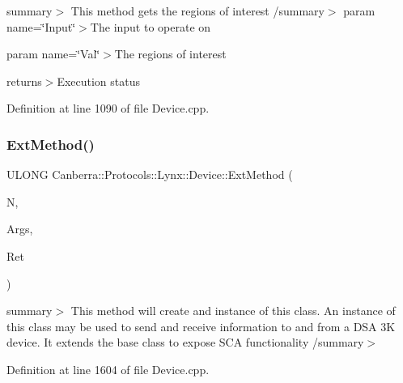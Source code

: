 summary$>$ This method gets the regions of interest /summary$>$ param name=\char`\"{}\+Input\char`\"{}$>$The input to operate on

param name=\char`\"{}\+Val\char`\"{}$>$The regions of interest

returns$>$Execution status

Definition at line 1090 of file Device.\+cpp.

\mbox{\label{class_canberra_1_1_protocols_1_1_lynx_1_1_device_a0d3ade2b5f6cbc402008bad5427d3da6_a0d3ade2b5f6cbc402008bad5427d3da6}} 
\subsubsection{\texorpdfstring{Ext\+Method()}{ExtMethod()}}
{\footnotesize\ttfamily U\+L\+O\+NG Canberra\+::\+Protocols\+::\+Lynx\+::\+Device\+::\+Ext\+Method (\begin{DoxyParamCaption}\item[{const \hyperlink{class_canberra_1_1_utility_1_1_core_1_1_string}{Canberra\+::\+Utility\+::\+Core\+::\+String} \&}]{N,  }\item[{const \hyperlink{class_canberra_1_1_utility_1_1_core_1_1_variant_array}{Canberra\+::\+Utility\+::\+Core\+::\+Variant\+Array} \&}]{Args,  }\item[{\hyperlink{class_canberra_1_1_utility_1_1_core_1_1_variant_array}{Canberra\+::\+Utility\+::\+Core\+::\+Variant\+Array} \&}]{Ret }\end{DoxyParamCaption})}

summary$>$ This method will create and instance of this class. An instance of this class may be used to send and receive information to and from a D\+SA 3K device. It extends the base class to expose S\+CA functionality /summary$>$ 

Definition at line 1604 of file Device.\+cpp.

\mbox{\label{class_canberra_1_1_protocols_1_1_lynx_1_1_device_ac77d98daff94392709601858b2980766_ac77d98daff94392709601858b2980766}} 
